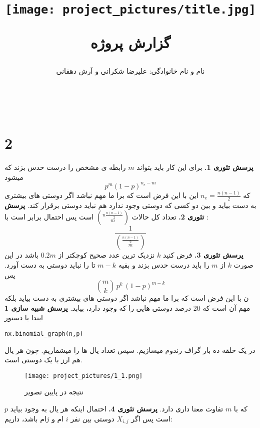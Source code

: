 \documentclass[11pt]{article}
\begin{document}
\setlength{\textwidth}{180mm}
\setlength{\textheight}{235mm }
\setlength{\textwidth}{12cm}
\setlength{\textheight}{19.5cm}

\begin{persian}
\title{
\centerline{\texttt{[image: project\_pictures/title.jpg]}}
گزارش پروژه
}
\author{نام و نام خانوادگی: علیرضا شکرانی و آرش دهقانی}
\date{}
\maketitle
\newpage
$\newcommand{\E}{\mathbbm{E}}$
$\newcommand{\Var}{\mathrm{Var}}$
\section*{2}
\textbf{پرسش تئوری 1.}
برای این کار باید بتواند $m$ رابطه ی مشخص را درست حدس بزند که میشود 
$$p^m(1-p)^{n_e-m}$$
 که 
$n_e = \frac{n(n-1)}{2}$
این با این فرض است که برا ما مهم نباشد اگر دوستی های بیشتری به دست بیاید و بین دو کسی که دوستی وجود ندارد هم نباید دوستی برقرار کند.
\newline
\textbf{پرسش تئوری 2.}
تعداد کل حالات 
$
n\frac{n(n-1)}{2} \choose  m
$
است پس احتمال برابر است با :
$$
\frac{1}{{\frac{n(n-1)}{2} \choose m}}
$$
\newline
\textbf{پرسش تئوری 3.}
فرض کنید $k$ نزدیک ترین عدد صحیح کوچکتر از $0.2m$ باشد در این صورت $k$ از $m$ را باید درست حدس بزند و بقیه $m-k$ تا را نباید دوستی به دست آورد. پس
$$
{m \choose k} \,p^k\,(1-p)^{m-k}
$$
ن با این فرض است که برا ما مهم نباشد اگر دوستی های بیشتری به دست بیاید بلکه مهم آن است که 20 درصد  دوستی هایی را که وجود دارد، بیابد.
\newline
\textbf{پرسش شبیه سازی 1}
ابتدا با دستور
\begin{latin}
\lstset{language=python}
\begin{lstlisting}
nx.binomial_graph(n,p)
\end{lstlisting}
\end{latin}
در یک حلقه ده بار گراف رندوم میسازیم. سپس تعداد یال ها را میشماریم. چون هر یال هم ارز با یک دوستی است.

\begin{figure}[H]
\centerline{\texttt{[image: project\_pictures/1\_1.png]}}
\caption{نتیجه در پایین تصویر }
\end{figure}
که با $m$ تفاوت معنا داری دارد.
\newline
\textbf{پرسش تئوری 4.}
احتمال اینکه هر یال به وجود بیاید  $p$ است پس اگر 
$X_{i,j}$ 
دوستی بین نفر $i$ ام و $j$ام باشد، داریم:


\end{persian}
\end{document}
